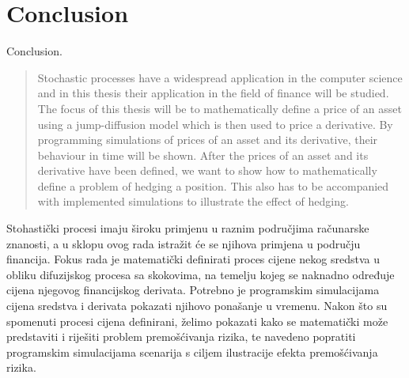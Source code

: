 \documentclass[times, utf8, diplomski]{fer}
\begin{document}

\chapter{Conclusion}
Conclusion.



\nocite{*}

\listoffigures

\newpage
\begin{abstract}
Stochastic processes have a widespread application in the computer science and in this thesis their application in the field of finance will be studied. The focus of this thesis will be to mathematically define a price of an asset using a jump-diffusion model which is then used to price a derivative. By programming simulations of prices of an asset and its derivative, their behaviour in time will be shown. After the prices of an asset and its derivative have been defined, we want to show how to mathematically define a problem of hedging a position. This also has to be accompanied with implemented simulations to illustrate the effect of hedging.

\end{abstract}

\begin{sazetak}
Stohastički procesi imaju široku primjenu u raznim područjima računarske znanosti, a u sklopu ovog rada istražit će se njihova primjena u području financija. Fokus rada je matematički definirati proces cijene nekog sredstva u obliku difuzijskog procesa sa skokovima, na temelju kojeg se naknadno određuje cijena njegovog financijskog derivata. Potrebno je programskim simulacijama cijena sredstva i derivata pokazati njihovo ponašanje u vremenu. Nakon što su spomenuti procesi cijena definirani, želimo pokazati kako se matematički može predstaviti i riješiti problem premošćivanja rizika, te navedeno popratiti programskim simulacijama scenarija s ciljem ilustracije efekta premošćivanja rizika.

\end{sazetak}
\end{document}
